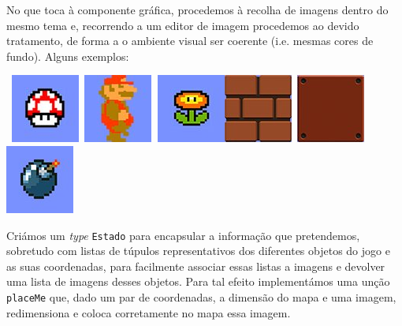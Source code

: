 \documentclass[a4paper]{article}
\begin{document}
    No que toca à componente gráfica, procedemos à recolha de imagens dentro do mesmo tema e, recorrendo a um editor
    de imagem procedemos ao devido tratamento, de forma a o ambiente visual ser coerente (i.e. mesmas cores de fundo). Alguns exemplos: \hspace{4.5cm}
    \linebreak
    \begin{center}
    \texttt{
    \includegraphics[scale=0.5]{powerup_bombs.jpg} \includegraphics[scale=0.5]{0.jpg}
    \includegraphics[scale=0.5]{powerup_flames.jpg}\hspace{0.15cm}\includegraphics[scale=1.87]{brick.jpg}
    \includegraphics[scale=0.38]{rocks.jpg}         \includegraphics[scale=0.5]{bomb1.jpg}} \end{center}

    
    Criámos um \textit{type} \texttt{Estado} para encapsular a informação que pretendemos, sobretudo com listas de túpulos
    representativos dos diferentes objetos do jogo e as suas coordenadas, para facilmente associar essas listas a imagens
    e devolver uma lista de imagens desses objetos. Para tal efeito implementámos uma unção \texttt{placeMe} que, dado
    um par de coordenadas, a dimensão do mapa e uma imagem, redimensiona e coloca corretamente no mapa essa imagem. 
\end{document}
